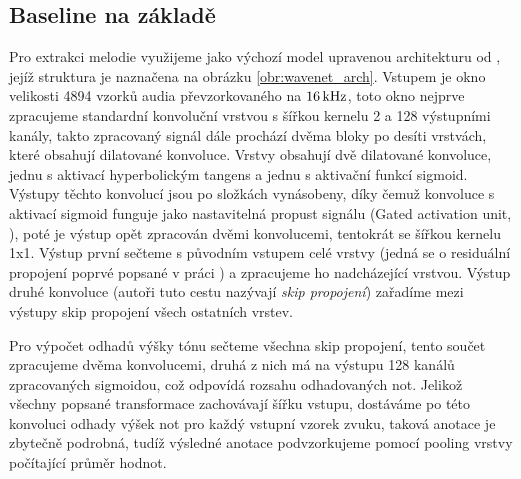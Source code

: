 \subsection{Baseline na základě \cite{Martak2018}}



Pro extrakci melodie využijeme jako výchozí model upravenou architekturu od \cite{Martak2018}, jejíž struktura je naznačena na obrázku \ref{obr:wavenet_arch}. Vstupem je okno velikosti 4894 vzorků audia převzorkovaného na $16\,\rm kHz$, toto okno nejprve zpracujeme standardní konvoluční vrstvou s šířkou kernelu 2 a 128 výstupními kanály, takto zpracovaný signál dále prochází dvěma bloky po desíti vrstvách, které obsahují dilatované konvoluce. Vrstvy obsahují dvě dilatované konvoluce, jednu s aktivací hyperbolickým tangens a jednu s aktivační funkcí sigmoid. Výstupy těchto konvolucí jsou po složkách vynásobeny, díky čemuž konvoluce s aktivací sigmoid funguje jako nastavitelná propust signálu (Gated activation unit, \cite{Oord2016a}), poté je výstup opět zpracován dvěmi konvolucemi, tentokrát se šířkou kernelu 1x1. Výstup první sečteme s původním vstupem celé vrstvy (jedná se o residuální propojení poprvé popsané v práci \cite{He2015}) a zpracujeme ho nadcházející vrstvou. Výstup druhé konvoluce (autoři tuto cestu nazývají \emph{skip propojení}) zařadíme mezi výstupy skip propojení všech ostatních vrstev.

Pro výpočet odhadů výšky tónu sečteme všechna skip propojení, tento součet zpracujeme dvěma konvolucemi, druhá z nich má na výstupu 128 kanálů zpracovaných sigmoidou, což odpovídá rozsahu odhadovaných not. Jelikož všechny popsané transformace zachovávají šířku vstupu, dostáváme po této konvoluci odhady výšek not pro každý vstupní vzorek zvuku, taková anotace je zbytečně podrobná, tudíž výsledné anotace podvzorkujeme pomocí pooling vrstvy počítající průměr hodnot.







